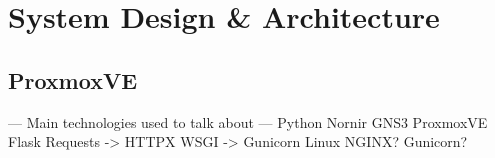
\chapter{System Design & Architecture}


\label{ChapterSystemDesignArchitecture}



\section{ProxmoxVE}



--- Main technologies used to talk about ---
Python
Nornir
GNS3
ProxmoxVE
Flask
Requests -> HTTPX
WSGI -> Gunicorn
Linux
NGINX?
Gunicorn?